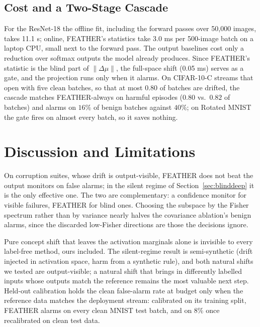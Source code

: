 \documentclass[conference]{IEEEtran}
\begin{document}
\subsection{Cost and a Two-Stage Cascade}
\label{sec:cascade}

For the ResNet-18 the offline fit, including the forward passes over
50{,}000 images, takes 11.1 s; online, FEATHER's statistics take 3.0 ms per
500-image batch on a laptop CPU, small next to the forward pass. The output
baselines cost only a reduction over softmax outputs the model already
produces. Since FEATHER's statistic is the blind part of
$\lVert\Delta\mu\rVert$, the full-space shift (0.05 ms) serves as a gate, and
the projection runs only when it alarms. On CIFAR-10-C streams that open with five clean batches, so that at
most $0.80$ of batches are drifted, the cascade matches
FEATHER-always on harmful episodes ($0.80$ vs.\ $0.82$ of batches) and alarms
on $16\%$ of benign batches against $40\%$; on Rotated MNIST the gate fires on
almost every batch, so it saves nothing.

\section{Discussion and Limitations}
\label{sec:limitations}

On corruption suites, whose drift is output-visible, FEATHER does not beat the
output monitors on false alarms; in the silent regime of
Section~\ref{sec:blinddeep} it is the only effective one. The two are
complementary: a confidence monitor for visible failures, FEATHER for blind
ones. Choosing the subspace by the Fisher spectrum rather than by variance
nearly halves the covariance ablation's benign alarms, since the discarded
low-Fisher directions are those the decisions ignore.

Pure concept shift that leaves the activation marginals alone is invisible to
every label-free method, ours included. The silent-regime result is
semi-synthetic (drift injected in activation space, harm from a synthetic
rule), and both natural shifts we tested are output-visible; a natural shift
that brings in differently labelled inputs whose outputs match the reference
remains the most valuable next step. Held-out calibration holds the clean
false-alarm rate at budget only when the reference data matches the deployment
stream: calibrated on its training split, FEATHER alarms on every clean MNIST
test batch, and on $8\%$ once recalibrated on clean test data.
\end{document}
